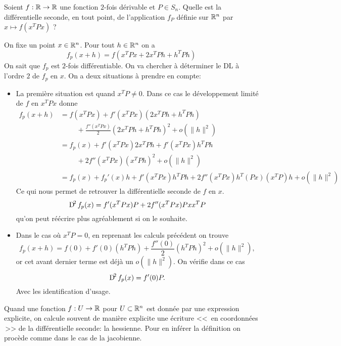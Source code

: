 \documentclass[11pt, a4paper]{article}
\begin{document}
\begin{question}
  Soient $f : \mathbb{R} \to \mathbb{R}$ une fonction $2$-fois dérivable et
  $P \in S_n$.  Quelle est la différentielle seconde, en tout point,
  de l'application $f_P$ définie sur $\mathbb{R}^n$ par $x \mapsto f(x^TPx)$ ?
\end{question}
\begin{solution}
  On fixe un point $x \in \mathbb{R}^n$. Pour tout $h \in \mathbb{R}^n$ on a
  \[
    f_p(x + h) = f(x^TPx + 2x^TPh + h^TPh)
  \]
  On sait que $f_p$ est $2$-fois différentiable. On va chercher à
  déterminer le DL à l'ordre $2$ de $f_p$ en $x$. On a deux situations
  à prendre en compte:
  \begin{itemize}
  \item[\textbullet] La première situation est quand $x^TP \neq
    0$. Dans ce cas le développement limité de $f$ en $x^TPx$ donne
    \begin{align*}
      f_p(x+h) & = f(x^TPx) + f'(x^TPx)(2x^TPh + h^TPh)\\ 
               & \phantom{=} \quad + \frac{f''(x^TPx)}{2}(2x^TPh + h^TPh)^2 + o(\|h\|^2)\\
               & = f_p(x) + f'(x^TPx)2x^TPh + f'(x^TPx)h^TPh \\
               & \phantom{=} \quad + 2f''(x^TPx)(x^TPh)^2 + o(\|h\|^2) \\
               & = f_p(x) + f_p'(x)h + f'(x^TPx)h^TPh  +  2f''(x^TPx)h^T(Px)(x^TP)h + o(\|h\|^2)
    \end{align*}
    Ce qui nous permet de retrouver la différentielle seconde de $f$ en $x$. 
    \[
      \operatorname{D\!}^2{f_p}(x) = f'(x^TPx)P + 2f''(x^TPx)Pxx^TP
    \]
    qu'on peut réécrire plus agréablement si on le souhaite. 
  \item[\textbullet] Dans le cas où $x^TP = 0$, en reprenant les
    calculs précédent on trouve
    \[
    f_p(x + h) = f(0) + f'(0)(h^TPh) + \frac{f''(0)}{2}(h^TPh)^2 + o(\|h\|^2),
    \]
    or cet avant dernier terme est déjà un $o(\|h\|^2)$. On vérifie
    dans ce cas
    \[
      \operatorname{D\!}^2{f_p}(x) = f'(0)P.
    \]
    Avec les identification d'usage.
  \end{itemize}
\end{solution}
Quand une fonction $f : U \to \mathbb{R}$ pour $U \subset \mathbb{R}^n$ est donnée par
une expression explicite, on calcule souvent de manière explicite une
écriture <<\, en coordonnées \,>> de la différentielle seconde: la
hessienne. Pour en inférer la définition on procède comme dans le cas
de la jacobienne.
\end{document}
